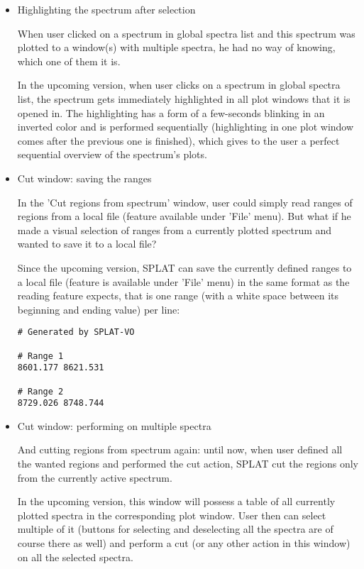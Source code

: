 \documentclass[final,authoryear,5p,times,twocolumn]{elsarticle}
\begin{document}
\begin{itemize}
\item Highlighting the spectrum after selection

  When user clicked on a spectrum in global spectra list and this
  spectrum was plotted to a window(s) with multiple spectra, he had no
  way of knowing, which one of them it is.

  In the upcoming version, when user clicks on a spectrum in global
  spectra list, the spectrum gets immediately highlighted in all plot
  windows that it is opened in. The highlighting has a form of a
  few-seconds blinking in an inverted color and is performed
  sequentially (highlighting in one plot window comes after the
  previous one is finished), which gives to the user a perfect
  sequential overview of the spectrum's plots.

\item Cut window: saving the ranges

  In the 'Cut regions from spectrum' window, user could simply read
  ranges of regions from a local file (feature available under 'File'
  menu). But what if he made a visual selection of ranges from a
  currently plotted spectrum and wanted to save it to a local file?

  Since the upcoming version, SPLAT can save the currently defined
  ranges to a local file (feature is available under 'File' menu) in
  the same format as the reading feature expects, that is one range
  (with a white space between its beginning and ending value) per
  line:

\begin{verbatim}
# Generated by SPLAT-VO

# Range 1
8601.177 8621.531

# Range 2
8729.026 8748.744
\end{verbatim}

\item Cut window: performing on multiple spectra

  And cutting regions from spectrum again: until now, when user
  defined all the wanted regions and performed the cut action, SPLAT
  cut the regions only from the currently active spectrum.

  In the upcoming version, this window will possess a table of all
  currently plotted spectra in the corresponding plot window. User
  then can select multiple of it (buttons for selecting and
  deselecting all the spectra are of course there as well) and perform
  a cut (or any other action in this window) on all the selected
  spectra.


\end{itemize}
\end{document}
